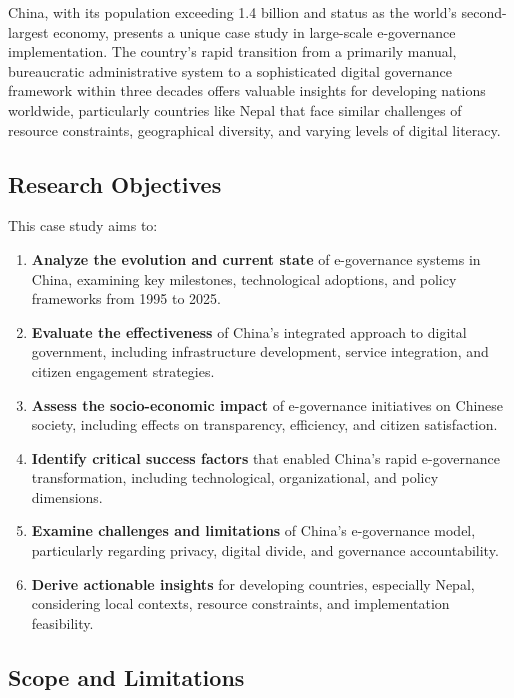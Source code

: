 \documentclass[12pt,a4paper]{article}
\begin{document}
China, with its population exceeding 1.4 billion and status as the world's second-largest economy, presents a unique case study in large-scale e-governance implementation. The country's rapid transition from a primarily manual, bureaucratic administrative system to a sophisticated digital governance framework within three decades offers valuable insights for developing nations worldwide, particularly countries like Nepal that face similar challenges of resource constraints, geographical diversity, and varying levels of digital literacy.

\subsection{Research Objectives}

This case study aims to:

\begin{enumerate}[label=\arabic*.]
    \item \textbf{Analyze the evolution and current state} of e-governance systems in China, examining key milestones, technological adoptions, and policy frameworks from 1995 to 2025.
    
    \item \textbf{Evaluate the effectiveness} of China's integrated approach to digital government, including infrastructure development, service integration, and citizen engagement strategies.
    
    \item \textbf{Assess the socio-economic impact} of e-governance initiatives on Chinese society, including effects on transparency, efficiency, and citizen satisfaction.
    
    \item \textbf{Identify critical success factors} that enabled China's rapid e-governance transformation, including technological, organizational, and policy dimensions.
    
    \item \textbf{Examine challenges and limitations} of China's e-governance model, particularly regarding privacy, digital divide, and governance accountability.
    
    \item \textbf{Derive actionable insights} for developing countries, especially Nepal, considering local contexts, resource constraints, and implementation feasibility.
\end{enumerate}

\subsection{Scope and Limitations}
\end{document}
